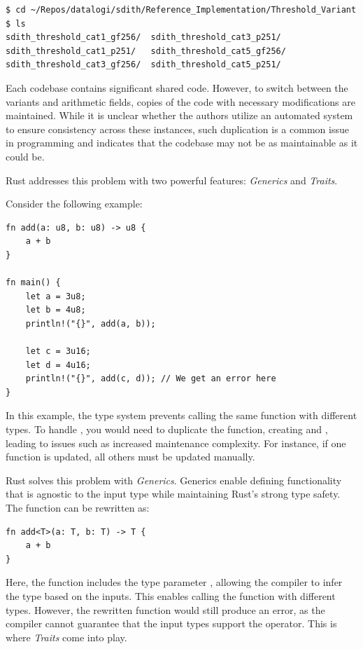 \documentclass[twoside,11pt]{report}
\theoremstyle{definition}
\theoremstyle{plain}
\begin{document}
\begin{verbatim}
$ cd ~/Repos/datalogi/sdith/Reference_Implementation/Threshold_Variant 
$ ls
sdith_threshold_cat1_gf256/  sdith_threshold_cat3_p251/
sdith_threshold_cat1_p251/   sdith_threshold_cat5_gf256/
sdith_threshold_cat3_gf256/  sdith_threshold_cat5_p251/
\end{verbatim}

Each codebase contains significant shared code. However, to switch between the variants and arithmetic fields, copies of the code with necessary modifications are maintained. While it is unclear whether the authors utilize an automated system to ensure consistency across these instances, such duplication is a common issue in programming and indicates that the codebase may not be as maintainable as it could be.

Rust addresses this problem with two powerful features: \textit{Generics} and \textit{Traits}.

Consider the following example:

\begin{verbatim}
fn add(a: u8, b: u8) -> u8 {
    a + b
}

fn main() {
    let a = 3u8;
    let b = 4u8;
    println!("{}", add(a, b));

    let c = 3u16;
    let d = 4u16;
    println!("{}", add(c, d)); // We get an error here
}
\end{verbatim}

In this example, the type system prevents calling the same function with different types. To handle , you would need to duplicate the function, creating  and , leading to issues such as increased maintenance complexity. For instance, if one function is updated, all others must be updated manually.

Rust solves this problem with \textit{Generics}. Generics enable defining functionality that is agnostic to the input type while maintaining Rust's strong type safety. The function  can be rewritten as:

\begin{verbatim}
fn add<T>(a: T, b: T) -> T {
    a + b
}
\end{verbatim}

Here, the function  includes the type parameter , allowing the compiler to infer the type based on the inputs. This enables calling the function with different types. However, the rewritten function would still produce an error, as the compiler cannot guarantee that the input types support the \rust{+} operator. This is where \textit{Traits} come into play.
\end{document}

